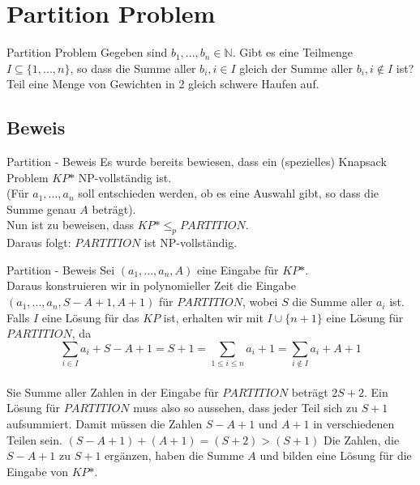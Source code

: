 \documentclass[12pt,donthandout,notes=dontshow,xcolor=table]{beamer}
\begin{document}
\section{Partition Problem}
\begin{frame}{Partition Problem}
Gegeben sind \(b_1,...,b_n \in \mathbb{N}\). Gibt es eine Teilmenge \(I \subseteq \{1,...,n\}\), so dass die Summe aller \(b_i, i \in I\) gleich der Summe aller \(b_i, i \notin I\) ist?\\
\textrightarrow Teil eine Menge von Gewichten in 2 gleich schwere Haufen auf.
\end{frame}

\subsection{Beweis}
\begin{frame}{Partition - Beweis}
Es wurde bereits bewiesen, dass ein (spezielles) Knapsack Problem \(KP\mbox{*}\) NP-vollständig ist.\\
(Für \(a_1,...,a_n\) soll entschieden werden, ob es eine Auswahl gibt, so dass die Summe genau \(A\) beträgt).\\
Nun ist zu beweisen, dass \(KP\mbox{*} \leq_p PARTITION\).\\
Daraus folgt: \(PARTITION\) ist NP-vollständig.
\end{frame}

\begin{frame}{Partition - Beweis}
Sei \((a_1,...,a_n,A)\) eine Eingabe für \(KP\mbox{*}\).\\
Daraus konstruieren wir in polynomieller Zeit die Eingabe\\
\((a_1,...,a_n,S-A+1,A+1)\) für \(PARTITION\), wobei \(S\) die Summe aller \(a_i\) ist.\\
Falls \(I\) eine Lösung für das \(KP\) ist, erhalten wir mit \(I \cup \{n+1\}\) eine Lösung für \(PARTITION\), da\\
$$\sum_{i \in I}a_i + S - A + 1 = S + 1 = \sum_{1 \le i \le n}a_i + 1 = \sum_{i \notin I}a_i + A + 1$$\\
Sie Summe aller Zahlen in der Eingabe für \(PARTITION\) beträgt \(2S + 2\).
Ein Lösung für \(PARTITION\) muss also so aussehen, dass jeder Teil sich zu \(S + 1\) aufsummiert.
Damit müssen die Zahlen \(S - A + 1\) und \(A + 1\) in verschiedenen Teilen sein.
\((S - A + 1) + (A + 1) = (S + 2) > (S + 1)\)
Die Zahlen, die \(S - A + 1\) zu \(S + 1\) ergänzen, haben die Summe \(A\) und bilden eine Lösung für die Eingabe von \(KP\mbox{*}\).
\end{frame}
\end{document}
